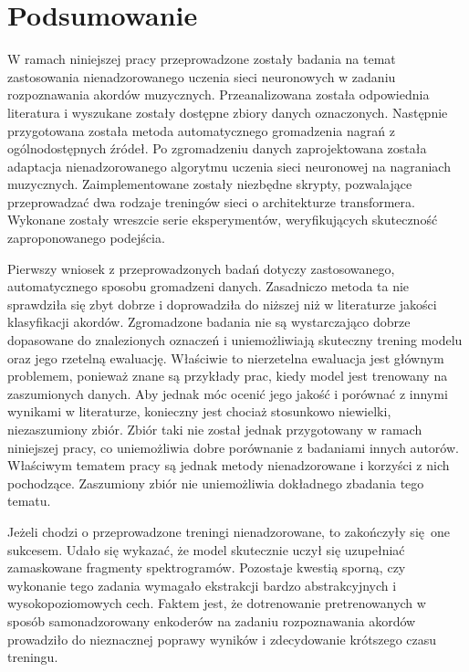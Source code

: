 \chapter{Podsumowanie} \label{chapter:summary}

W ramach niniejszej pracy przeprowadzone zostały badania na temat zastosowania nienadzorowanego uczenia sieci neuronowych w zadaniu rozpoznawania akordów muzycznych. Przeanalizowana została odpowiednia literatura i wyszukane zostały dostępne zbiory danych oznaczonych. Następnie przygotowana została metoda automatycznego gromadzenia nagrań z ogólnodostępnych źródeł. Po zgromadzeniu danych zaprojektowana została adaptacja nienadzorowanego algorytmu uczenia sieci neuronowej na nagraniach muzycznych. Zaimplementowane zostały niezbędne skrypty, pozwalające przeprowadzać dwa rodzaje treningów sieci o architekturze transformera. Wykonane zostały wreszcie serie eksperymentów, weryfikujących skuteczność zaproponowanego podejścia.

Pierwszy wniosek z przeprowadzonych badań dotyczy zastosowanego, automatycznego sposobu gromadzeni danych. Zasadniczo metoda ta nie sprawdziła się zbyt dobrze i doprowadziła do niższej niż w literaturze jakości klasyfikacji akordów. Zgromadzone badania nie są wystarczająco dobrze dopasowane do znalezionych oznaczeń i uniemożliwiają skuteczny trening modelu oraz jego rzetelną ewaluację. Właściwie to nierzetelna ewaluacja jest głównym problemem, ponieważ znane są przykłady prac, kiedy model jest trenowany na zaszumionych danych. Aby jednak móc ocenić jego jakość i porównać z innymi wynikami w literaturze, konieczny jest chociaż stosunkowo niewielki, niezaszumiony zbiór. Zbiór taki nie został jednak przygotowany w ramach niniejszej pracy, co uniemożliwia dobre porównanie z badaniami innych autorów. Właściwym tematem pracy są jednak metody nienadzorowane i korzyści z nich pochodzące. Zaszumiony zbiór nie uniemożliwia dokładnego zbadania tego tematu.

Jeżeli chodzi o przeprowadzone treningi nienadzorowane, to zakończyły się one sukcesem. Udało się wykazać, że model skutecznie uczył się uzupełniać zamaskowane fragmenty spektrogramów. Pozostaje kwestią sporną, czy wykonanie tego zadania wymagało ekstrakcji bardzo abstrakcyjnych i wysokopoziomowych cech. Faktem jest, że dotrenowanie pretrenowanych w sposób samonadzorowany enkoderów na zadaniu rozpoznawania akordów prowadziło do nieznacznej poprawy wyników i zdecydowanie krótszego czasu treningu.

